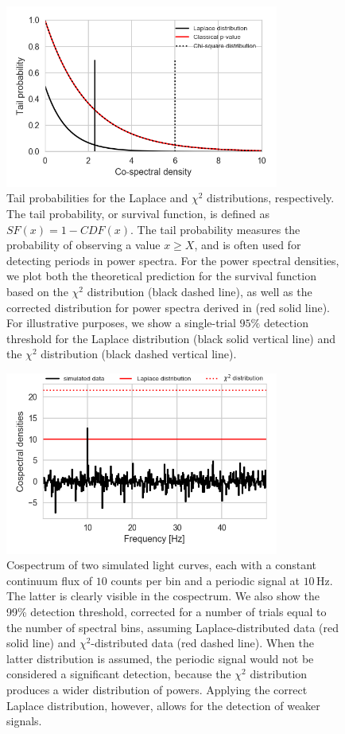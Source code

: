\documentclass[12pt]{emulateapj}
\begin{document}
\begin{figure}
\begin{center}
\includegraphics[width=9cm]{../figs/tailprob.png}
\caption{Tail probabilities for the Laplace and $\chi^2$ distributions, respectively. The tail probability, or survival function, is defined as $SF(x) = 1 - CDF(x)$. The tail probability measures the probability of observing a value $x\geq X$, and is often used for detecting periods in power spectra. For the power spectral densities, we plot both the theoretical prediction for the survival function based on the $\chi^2$ distribution (black dashed line), as well as the corrected distribution for power spectra derived in \citet{groth1975} (red solid line). For illustrative purposes, we show a single-trial $95\%$ detection threshold for the Laplace distribution (black solid vertical line) and the $\chi^2$ distribution (black dashed vertical line).}
\label{fig:survival}
\end{center}
\end{figure}

\begin{figure}
\begin{center}
\includegraphics[width=9cm]{../figs/cs_detec.png}
\caption{Cospectrum of two simulated light curves, each with a constant continuum flux of $10$ counts per bin and a periodic signal at $10\,\mathrm{Hz}$. The latter is clearly visible in the cospectrum. We also show the 99\% detection threshold, corrected for a number of trials equal to the number of spectral bins, assuming Laplace-distributed data (red solid line) and $\chi^2$-distributed data (red dashed line). When the latter distribution is assumed, the periodic signal would not be considered a significant detection, because the $\chi^2$ distribution produces a wider distribution of powers. Applying the correct Laplace distribution, however, allows for the detection of weaker signals.}
\label{fig:cs_sim}
\end{center}
\end{figure}
\end{document}
